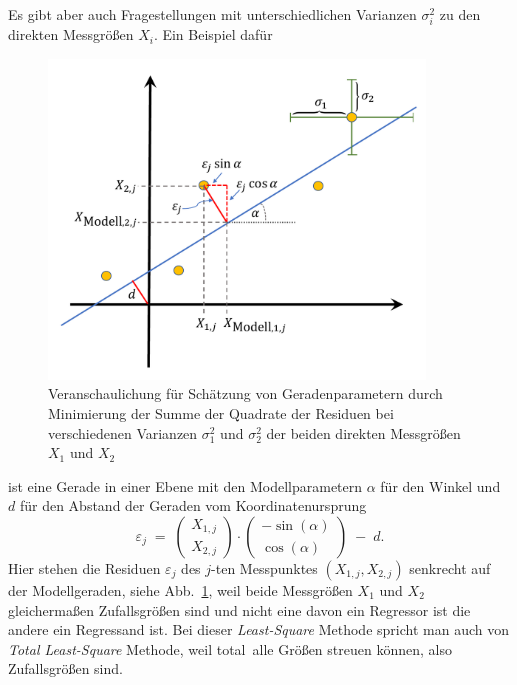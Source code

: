 Es gibt aber auch Fragestellungen mit unterschiedlichen Varianzen $\sigma_i^2$ 
zu den direkten Messgrößen $X_i$. Ein Beispiel dafür
\begin{figure}
\begin{center}
\includegraphics[width=100mm]{03_vorlesung/media/ResiduenVarianzen.pdf}
\end{center}
\caption{Veranschaulichung für Schätzung von Geradenparametern durch
Minimierung der Summe der Quadrate der Residuen bei verschiedenen Varianzen 
$\sigma_1^2$ und $\sigma_2^2$ der beiden direkten Messgrößen $X_1$ und $X_2$
\label{ResiduenVarianzen}}
\end{figure}
ist eine Gerade in einer Ebene mit den Modellparametern $\alpha$ für den Winkel und
$d$ für den Abstand der Geraden vom Koordinatenursprung
\begin{equation}
\varepsilon_j \; = \; 
\left(\begin{array}{c} X_{1,j}\\ X_{2,j}\end{array}\right) \cdot
\left(\begin{array}{c} -\sin(\alpha)\\ \cos(\alpha)\end{array}\right) \; - \; d .
\label{TLSgerade}
\end{equation}
Hier stehen die Residuen $\varepsilon_j$ des $j$-ten Messpunktes $(X_{1,j}, X_{2,j})$ 
senkrecht auf der Modellgeraden, siehe Abb.~\ref{ResiduenVarianzen}, weil beide
Messgrößen $X_1$ und $X_2$ gleichermaßen Zufallsgrößen sind und nicht eine davon
ein Regressor ist die andere ein Regressand ist. Bei dieser \textsl{Least-Square} Methode
spricht man auch von \textsl{Total Least-Square} Methode, weil \glqq total\grqq ~alle Größen
streuen können, also Zufallsgrößen sind.

